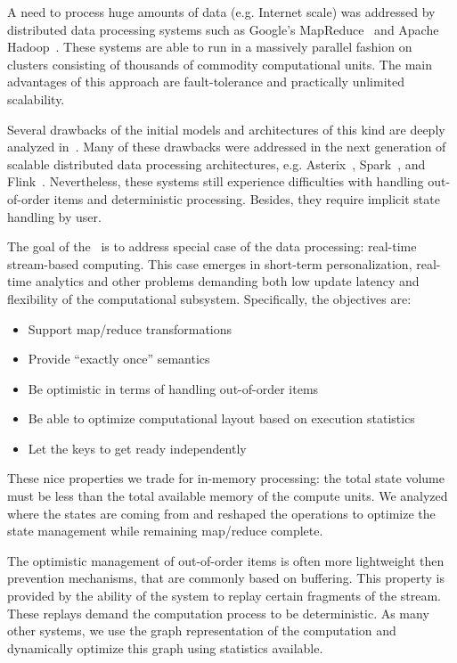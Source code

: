
\label {fs-intro-seciton}

A need to process huge amounts of data (e.g. Internet scale) was addressed by distributed data processing systems such as Google's MapReduce~\cite{Dean:2008:MSD:1327452.1327492} and Apache Hadoop~\cite{hadoop2009hadoop}. These systems are able to run in a massively parallel fashion on clusters consisting of thousands of commodity computational units. The main advantages of this approach are fault-tolerance and practically unlimited scalability.

Several drawbacks of the initial models and architectures of this kind are deeply analyzed in~\cite{Doulkeridis:2014:SLA:2628707.2628782}. Many of these drawbacks were addressed in the next generation of scalable distributed data processing architectures, e.g. Asterix~\cite{Alsubaiee:2012:ASW:2331801.2331803}, Spark~\cite{Zaharia:2016:ASU:3013530.2934664}, and Flink~\cite{carbone2015apache}. Nevertheless, these systems still experience difficulties with handling out-of-order items and deterministic processing. Besides, they require implicit state handling by user.  

The goal of the \FlameStream\ is to address special case of the data processing: real-time stream-based computing. This case emerges in short-term personalization, real-time analytics and other problems demanding both low update latency and flexibility of the computational subsystem. Specifically, the objectives are:

\begin {itemize}
\item Support map/reduce transformations
\item Provide ``exactly once'' semantics
\item Be optimistic in terms of handling out-of-order items
\item Be able to optimize computational layout based on execution statistics
\item Let the keys to get ready independently
\end {itemize}

These nice properties we trade for in-memory processing: the total state volume must be less than the total available memory of the compute units. We analyzed where the states are coming from and reshaped the operations to optimize the state management while remaining map/reduce complete. 

The optimistic management of out-of-order items is often more lightweight then prevention mechanisms, that are commonly based on buffering. This property is provided by the ability of the system to replay certain fragments of the stream. These replays demand the computation process to be deterministic. As many other systems, we use the graph representation of the computation and dynamically optimize this graph using statistics available. 

